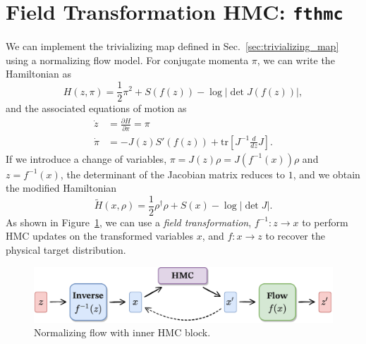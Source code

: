 \documentclass[a4paper,11pt]{article}
\begin{document}
\section{\label{sec:hmc_nf}Field Transformation HMC: \texttt{fthmc}}
%
We can implement the trivializing map defined in
Sec.~\ref{sec:trivializing_map} using a normalizing flow model.
%
For conjugate momenta \(\pi\), we can write the Hamiltonian as
%
\begin{equation}
    H(z, \pi) = \frac{1}{2}\pi^{2} + S(f(z)) - \log\left|\det J(f(z))\right|,
\end{equation}
%
and the associated equations of motion as
%
\begin{align}
    \dot{z} &= \frac{\partial H}{\partial \pi} = \pi \\
    \dot{\pi} &= -J(z) S'(f(z)) + \mathrm{tr}\left[ J^{-1}\frac{d}{dz} J \right].
\end{align}
%
If we introduce a change of variables, \(\pi = J(z)\rho = J(f^{-1}(x))\rho\)
and \(z = f^{-1}(x)\), the determinant of the Jacobian matrix reduces to \(1\),
and we obtain the modified Hamiltonian
%
\begin{equation}
    \tilde{H}(x, \rho) = \frac{1}{2}\rho^{\dagger}\rho + S(x) - \log|\det J|.
\end{equation}
%
As shown in Figure~\ref{fig:fthmc}, we can use a \emph{field transformation},
\(f^{-1}: z \rightarrow x\) to perform HMC updates on the transformed variables
\(x\), and \(f: x \rightarrow z\) to recover the physical target distribution.
%
\begin{figure}[htpb]
    \centering
    \includegraphics[width=\textwidth]{assets/fthmc.pdf}
    \caption{\label{fig:fthmc}Normalizing flow with inner HMC block.}
\end{figure}
%
\end{document}
